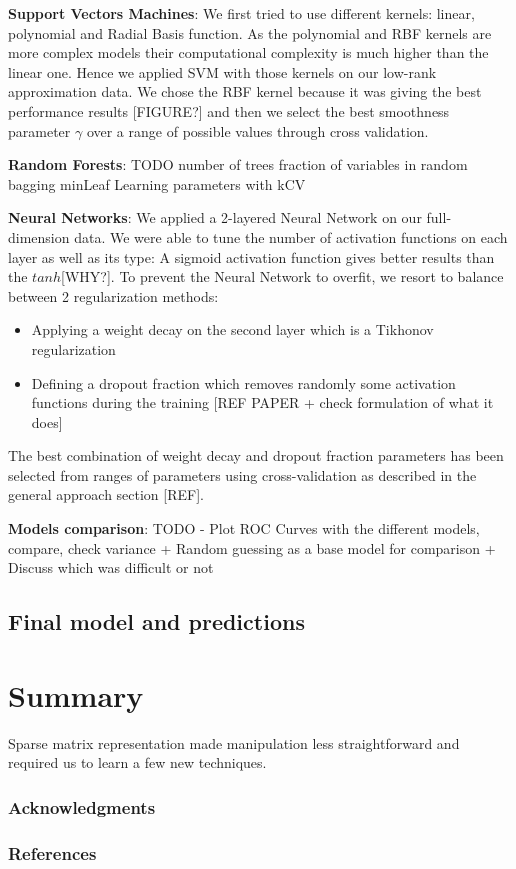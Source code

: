 \documentclass{article}
\begin{document}
    \textbf{Support Vectors Machines}: We first tried to use different kernels: linear, polynomial and Radial Basis function. As the polynomial and RBF kernels are more complex models their computational complexity is much higher than the linear one. Hence we applied SVM with those kernels on our low-rank approximation data. We chose the RBF kernel because it was giving the best performance results [FIGURE?] and then we select the best smoothness parameter $\gamma$ over a range of possible values through cross validation. 

    \textbf{Random Forests}: TODO
    number of trees
    fraction of variables in random bagging
    minLeaf
    Learning parameters with kCV
   
   \textbf{Neural Networks}: We applied a 2-layered Neural Network on our full-dimension data. We were able to tune the number of activation functions on each layer as well as its type: A sigmoid activation function gives better results than the $tanh$[WHY?]. To prevent the Neural Network to overfit, we resort to balance between 2 regularization methods:
   \begin{itemize}
    	\item Applying a weight decay on the second layer which is a Tikhonov regularization
	\item Defining a dropout fraction which removes randomly some activation functions during the training [REF PAPER + check formulation of what it does]
    \end{itemize}
	The best combination of weight decay and dropout fraction parameters has been selected from ranges of parameters using cross-validation as described in the general approach section [REF].
   
   \textbf{Models comparison}: TODO  
   - Plot ROC Curves with the different models, compare, check variance + Random guessing as a base model for comparison
   + Discuss which was difficult or not

  \subsection{Final model and predictions}



\section{Summary}
  Sparse matrix representation made manipulation less straightforward and required us to learn a few new techniques.

  \subsubsection*{Acknowledgments}

  \subsubsection*{References}
  
  
\end{document}
